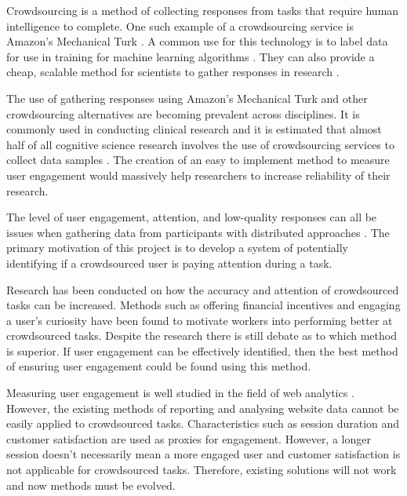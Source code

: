 \documentclass{article}
\begin{document}
Crowdsourcing is a method of collecting responses from tasks that require human intelligence to complete. 
One such example of a crowdsourcing service is Amazon's Mechanical Turk \cite{AmazonTurk}.
A common use for this technology is to label data for use in training for machine learning algorithms \cite{chang2017revolt}.
They can also provide a cheap, scalable method for scientists to gather responses in research \cite{paolacci2010running}.

The use of gathering responses using Amazon's Mechanical Turk and other crowdsourcing alternatives are becoming prevalent across disciplines.
It is commonly used in conducting clinical research \cite{chandler2016conducting} and it is estimated that almost half of all cognitive science research involves the use of crowdsourcing services to collect data samples \cite{stewart2017crowdsourcing}.
The creation of an easy to implement method to measure user engagement would massively help researchers to increase reliability of their research.

The level of user engagement, attention, and low-quality responses can all be issues when gathering data from participants with distributed approaches \cite{ipeirotis2010quality}.
The primary motivation of this project is to develop a system of potentially identifying if a crowdsourced user is paying attention during a task.


Research has been conducted on how the accuracy and attention of crowdsourced tasks can be increased.
Methods such as offering financial incentives \cite{ho2015incentivizing} and engaging a user's curiosity \cite{law2016curiosity} have been found to motivate workers into performing better at crowdsourced tasks.
Despite the research there is still debate as to which method is superior.
If user engagement can be effectively identified, then the best method of ensuring user engagement could be found using this method.


Measuring user engagement is well studied in the field of web analytics \cite{peterson2008measuring}.
However, the existing methods of reporting and analysing website data cannot be easily applied to crowdsourced tasks.    
Characteristics such as session duration and customer satisfaction are used as proxies for engagement.
However, a longer session doesn't necessarily mean a more engaged user and customer satisfaction is not applicable for crowdsourced tasks.
Therefore, existing solutions will not work and now methods must be evolved.
\end{document}
